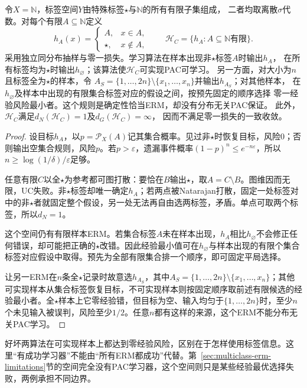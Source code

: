 \begin{theorem}[可学习性不推出一致收敛]
\label{thm:multiclass-erm-separation}
令$X=\mathbb N$，标签空间$Y$由特殊标签$\star$与$\mathbb N$的所有有限子集组成，
二者均取离散$\sigma$代数。对每个有限$A\subseteq\mathbb N$定义
\[
 h_A(x)=\begin{cases}A,&x\in A,\\\star,&x\notin A,\end{cases}
 \qquad
 \mathcal H_C=\{h_A:A\subseteq\mathbb N\text{有限}\}.
\]
采用独立同分布抽样与零一损失。学习算法在样本出现非$\star$标签$A$时输出$h_A$，
在所有标签均为$\star$时输出$h_{\varnothing}$；该算法使$\mathcal H_C$可实现PAC可学习。
另一方面，对大小为$n$且标签全为$\star$的样本，令
$A_S=\{1,\ldots,2n\}\setminus\{x_1,\ldots,x_n\}$并输出$h_{A_S}$；对其他样本，
在$h_{\varnothing}$及样本中出现的有限集合标签对应的假设之间，按预先固定的顺序选择
零一经验风险最小者。这个规则是确定性恰当ERM，却没有分布无关PAC保证。
此外，$\mathcal H_C$满足$d_N(\mathcal H_C)=1$及$d_G(\mathcal H_C)=\infty$，
因而不满足零一损失的一致收敛。
\end{theorem}

\begin{proof}
设目标$h_A$，以$p=\mathcal P_X(A)$记其集合概率。见过非$\star$时恢复目标，风险0；否则输出空集合规则，风险$p$。若$p>\varepsilon$，遗漏事件概率$(1-p)^n\leq e^{-n\varepsilon}$，所以$n\geq\log(1/\delta)/\varepsilon$足够。

任意有限$C$以全$\star$为参考都可图打散：要恰在$B$输出$\star$，取$A=C\setminus B$。图维因而无限，UC失败。非$\star$标签却唯一确定$h_A$；若两点被Natarajan打散，固定一处标签对中的非$\star$者就固定整个假设，另一处无法再自由选两标签，矛盾。单点可取两个标签，所以$d_N=1$。

这个空间仍有有限样本ERM。若集合标签$A$未在样本出现，$h_A$相比$h_{\varnothing}$不会修正任何错误，却可能把正确的$\star$改错。因此经验最小值可在$h_{\varnothing}$与样本出现的有限个集合标签对应假设中取得。预先为全部有限集合排一个顺序，即可固定平局选择。

让另一ERM在$n$条全$\star$记录时故意选$h_{A_S}$，其中$A_S=\{1,\ldots,2n\}\setminus\{x_1,\ldots,x_n\}$；其他可实现样本从集合标签恢复目标，不可实现样本则按固定顺序取前述有限候选的经验最小者。全$\star$样本上它零经验错，但目标为空、输入均匀于$\{1,\ldots,2n\}$时，至少$n$个未见输入被误判，风险至少$1/2$。任意$n$都有这样的来源，这个ERM不能分布无关PAC学习。
\end{proof}

好坏两算法在可实现样本上都达到零经验风险，区别在于怎样使用标签信息。这里“有成功学习器”不能由“所有ERM都成功”代替。第~\ref{sec:multiclass-erm-limitations}节的空间完全没有PAC学习器，这个空间则只是某些经验最优选择失败，两例承担不同边界。


